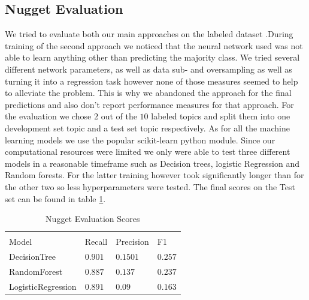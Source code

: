 \documentclass{article}
\begin{document}
\subsection{Nugget Evaluation}
We tried to evaluate both our main approaches on the labeled dataset %
.During training of the second approach we noticed that the neural network used was not able to learn anything other than predicting the majority class. We tried several different network parameters, as well as data sub- and oversampling as well as turning it into a regression task however none of those measures seemed to help to alleviate the problem. This is why we abandoned the approach for the final predictions and also don't report performance measures for that approach. For the evaluation we chose $2$ out of the $10$ labeled topics and split them into one development set topic and a test set topic respectively. As for all the machine learning models we use the popular scikit-learn python module. Since our computational resources were limited we only were able to test three different models in a reasonable timeframe such as Decision trees, logistic Regression and Random forests. For the latter training however took significantly longer than for the other two so less hyperparameters were tested.
The final scores on the Test set can be found in table \ref{Nugget_scores}.
\begin{table}
	\caption{Nugget Evaluation Scores}
	\label{Nugget_scores}
	\centering
	\begin{tabular}{llll}
		\toprule
		\multicolumn{4}{c}{}                   \\

		Model     & Recall & Precision & F1 \\
		\midrule
		DecisionTree & $0.901$  & $0.1501$ &   $0.257$   \\
		RandomForest     & $0.887$ & $0.137$ &   $0.237$   \\
		LogisticRegression     &  $0.891$ & $0.09$ & $0.163$  \\
		\bottomrule
	\end{tabular}
\end{table}
\end{document}
